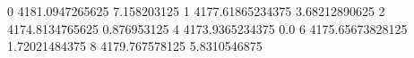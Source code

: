 0 4181.0947265625 7.158203125
1 4177.61865234375 3.68212890625
2 4174.8134765625 0.876953125
4 4173.9365234375 0.0
6 4175.65673828125 1.72021484375
8 4179.767578125 5.8310546875
